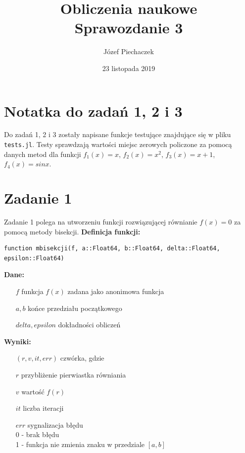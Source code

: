 \documentclass[12pt]{article}
\title{
	Obliczenia naukowe \\
	Sprawozdanie 3
}
\date{23 listopada 2019}
\author{Józef Piechaczek}
\begin{document}
\maketitle
\newpage
{}

\setlength{\abovedisplayskip}{5pt}
\setlength{\belowdisplayskip}{5pt}

\section*{Notatka do zadań 1, 2 i 3}
Do zadań 1, 2 i 3 zostały napisane funkcje testujące znajdujące się w pliku \texttt{tests.jl}. Testy sprawdzają wartości miejsc zerowych policzone za pomocą danych metod dla funkcji $f_1(x) = x$, $f_2(x)=x^2$, $f_3(x)=x+1$, $f_4(x)=sin x$.

\section{Zadanie 1}
Zadanie 1 polega na utworzeniu funkcji rozwiązującej równianie $f(x) = 0$ za pomocą metody bisekcji. \textbf{Definicja funkcji:}
\begin{verbatim}
function mbisekcji(f, a::Float64, b::Float64, delta::Float64, 
epsilon::Float64)
\end{verbatim}
\textbf{Dane:}
\begin{itemize}[leftmargin=4.0cm,labelsep=0.4cm]
\item[$f$] funkcja $f(x)$ zadana jako anonimowa funkcja
\item[$a, b$] końce przedziału początkowego
\item[$delta, epsilon$] dokładności obliczeń
\end{itemize}
\textbf{Wyniki:} 
\begin{itemize}[leftmargin=4.0cm,labelsep=0.4cm]
\item[$(r, v, it, err)$] czwórka, gdzie
\item[$r$] przybliżenie pierwiastka równiania 
\item[$v$] wartość $f(r)$
\item[$it$] liczba iteracji
\item[$err$] sygnalizacja błędu\\
0 - brak błędu\\
1 - funkcja nie zmienia znaku w przedziale $[a,b]$
\end{itemize}
\end{document}

